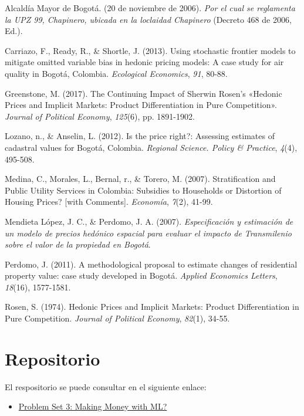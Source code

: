 \documentclass[
  11pt,
  letterpaper,
]{article}
\newlength{\cslhangindent}
\newlength{\cslentryspacingunit} %
\newenvironment{CSLReferences}[2] %
 {%
  \setlength{\parindent}{0pt}
  \ifodd #1
  \let\oldpar\par
  \def\par{\hangindent=\cslhangindent\oldpar}
  \fi
  \setlength{\parskip}{#2\cslentryspacingunit}
 }%
 {}
\begin{document}
\hypertarget{refs}{}
\begin{CSLReferences}{1}{0}
\leavevmode{}%
Alcaldía Mayor de Bogotá. (20 de noviembre de 2006). \emph{Por el cual se reglamenta la UPZ 99, Chapinero, ubicada en la loclaidad Chapinero} (Decreto 468 de 2006, Ed.).

\leavevmode{}%
Carriazo, F., Ready, R., \& Shortle, J. (2013). Using stochastic frontier models to mitigate omitted variable bias in hedonic pricing models: A case study for air quality in Bogotá, Colombia. \emph{Ecological Economics}, \emph{91}, 80-88.

\leavevmode{}%
Greenstone, M. (2017). The Continuing Impact of Sherwin Rosen's {«Hedonic Prices and Implicit Markets: Product Differentiation in Pure Competition»}. \emph{Journal of Political Economy}, \emph{125}(6), pp. 1891-1902.

\leavevmode{}%
Lozano, n., \& Anselin, L. (2012). Is the price right?: Assessing estimates of cadastral values for Bogotá, Colombia. \emph{Regional Science. Policy \& Practice}, \emph{4}(4), 495-508.

\leavevmode{}%
Medina, C., Morales, L., Bernal, r., \& Torero, M. (2007). Stratification and Public Utility Services in Colombia: Subsidies to Households or Distortion of Housing Prices? {[}with Comments{]}. \emph{Economía}, \emph{7}(2), 41-99.

\leavevmode{}%
Mendieta López, J. C., \& Perdomo, J. A. (2007). \emph{Especificaci{ó}n y estimaci{ó}n de un modelo de precios hed{ó}nico espacial para evaluar el impacto de Transmilenio sobre el valor de la propiedad en Bogot{á}}.

\leavevmode{}%
Perdomo, J. (2011). A methodological proposal to estimate changes of residential property value: case study developed in Bogotá. \emph{Applied Economics Letters}, \emph{18}(16), 1577-1581.

\leavevmode{}%
Rosen, S. (1974). Hedonic Prices and Implicit Markets: Product Differentiation in Pure Competition. \emph{Journal of Political Economy}, \emph{82}(1), 34-55.

\end{CSLReferences}

\hypertarget{repositorio}{%
\section{Repositorio}\label{repositorio}}

El respositorio se puede consultar en el siguiente enlace:

\begin{itemize}
  \item \href{https://github.com/guscastilloa/PS3_Repo-G3}{Problem Set 3: Making Money with ML?}
\end{itemize}
\end{document}
